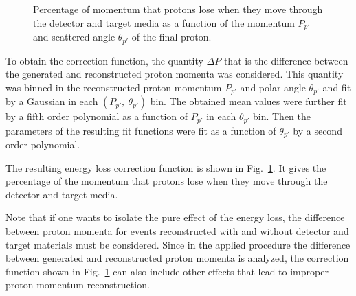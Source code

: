 \begin{figure}[htp]
\begin{center}
\caption{\small Percentage of momentum that protons lose when they move through the detector and target media as a function of the momentum $P_{p'}$ and scattered angle $\theta_{p'}$ of the final proton. \label{fig:eloss}} 
\end{center}
\end{figure}

To obtain the correction function, the quantity $\Delta P$ that is the difference between the generated and reconstructed proton momenta was considered. This quantity was binned in the reconstructed proton momentum $P_{p'}$ and polar angle $\theta_{p'}$ and fit by a Gaussian in each $(P_{p'},~\theta_{p'})$ bin. The obtained mean values were further fit by a fifth order polynomial as a function of $P_{p'}$ in each $\theta_{p'}$ bin. Then the parameters of the resulting fit functions were fit as a function of $\theta_{p'}$ by a second order polynomial. 



The resulting energy loss correction function is shown in Fig.~\ref{fig:eloss}. It gives the percentage of the momentum that protons lose when they move through the detector and target media. 

Note that if one wants to isolate the pure effect of the energy loss, the difference between proton momenta for events reconstructed with and without detector and target materials must be considered. Since in the applied procedure the difference between generated and reconstructed proton momenta is analyzed, the correction function shown in Fig.~\ref{fig:eloss} can also include other effects that lead to improper proton momentum reconstruction.



